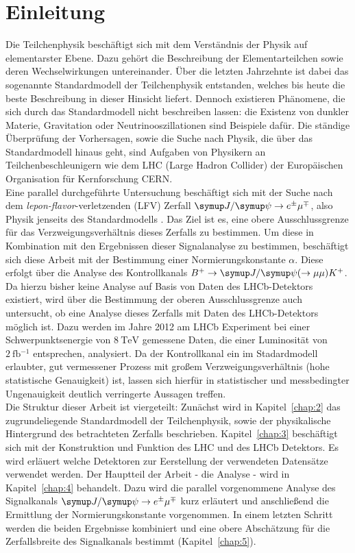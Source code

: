 \chapter{Einleitung}
%
Die Teilchenphysik beschäftigt sich mit dem Verständnis der Physik auf elementarster Ebene. Dazu gehört die Beschreibung der Elementarteilchen sowie deren Wechselwirkungen untereinander. Über die letzten Jahrzehnte ist dabei das sogenannte Standardmodell der Teilchenphysik entstanden, welches bis heute die beste Beschreibung in dieser Hinsicht liefert. Dennoch existieren Phänomene, die sich durch das Standardmodell nicht beschreiben lassen: die Existenz von dunkler Materie, Gravitation oder Neutrinooszillationen sind Beispiele dafür. Die ständige Überprüfung der Vorhersagen, sowie die Suche nach Physik, die über das Standardmodell hinaus geht, sind Aufgaben von Physikern an Teilchenbeschleunigern wie dem LHC (Large Hadron Collider) der Europäischen Organisation für Kernforschung CERN. \\
Eine parallel durchgeführte Untersuchung beschäftigt sich mit der Suche nach dem \textit{lepon-flavor}-verletzenden (LFV) Zerfall $\signal$, also Physik jenseits des Standardmodells \cite{ba-maik}. Das Ziel ist es, eine obere Ausschlussgrenze für das Verzweigungsverhältnis dieses Zerfalls zu bestimmen. Um diese in Kombination mit den Ergebnissen dieser Signalanalyse zu bestimmen, beschäftigt sich diese Arbeit mit der Bestimmung einer Normierungskonstante $\alpha$. Diese erfolgt über die Analyse des Kontrollkanals $B^{+}\rightarrow\jpsi(\rightarrow\mu\mu)K^{+}$. Da hierzu bisher keine Analyse auf Basis von Daten des LHCb-Detektors existiert, wird über die Bestimmung der oberen Ausschlussgrenze auch untersucht, ob eine Analyse dieses Zerfalls mit Daten des LHCb-Detektors möglich ist.
Dazu werden im Jahre 2012 am LHCb Experiment bei einer Schwerpunktsenergie von $\SI{8}{\tera\electronvolt}$ gemessene Daten, die einer Luminosität von $\SI{2}{\femto\barn^{-1}}$ entsprechen, analysiert. Da der Kontrollkanal ein im Stadardmodell erlaubter, gut vermessener Prozess mit großem Verzweigungsverhältnis (hohe statistische Genauigkeit) ist, lassen sich hierfür in statistischer und messbedingter Ungenauigkeit deutlich verringerte Aussagen treffen.  \\
Die Struktur dieser Arbeit ist viergeteilt: Zunächst wird in Kapitel~\ref{chap:2} das zugrundeliegende Standardmodell der Teilchenphysik, sowie der physikalische Hintergrund des betrachteten Zerfalls beschrieben. Kapitel~\ref{chap:3} beschäftigt sich mit der Konstruktion und Funktion des LHC und des LHCb Detektors. Es wird erläuert welche Detektoren zur Eerstellung der verwendeten Datensätze verwendet werden. Der Hauptteil der Arbeit - die Analyse - wird in Kapitel~\ref{chap:4} behandelt. Dazu wird die parallel vorgenommene Analyse des Signalkanals $\signal$ kurz erläutert und anschließend die Ermittlung der Normierungskonstante vorgenommen. In einem letzten Schritt werden die beiden Ergebnisse kombiniert und eine obere Abschätzung für die Zerfallsbreite des Signalkanals bestimmt (Kapitel~\ref{chap:5}).
